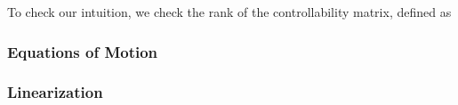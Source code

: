 \documentclass[conference]{IEEEtran}
\begin{document}
To check our intuition, we check the rank of the controllability matrix, defined as







\subsubsection{Equations of Motion}

\subsubsection{Linearization}
%
%

\end{document}
